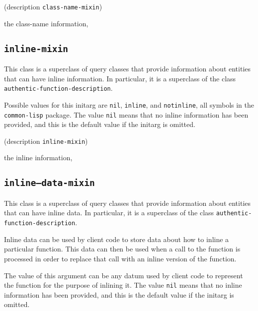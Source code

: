 {\footnotesize
{}
}

{\footnotesize
{} {(description {\tt class-name-mixin})}
}

 the class-name information, 

\subsection{\texttt{inline-mixin}}
\label{sec-inline-mixin}

{\footnotesize
{}
}

This class is a superclass of query classes that provide information
about entities that can have inline information.  In particular, it is a
superclass of the class \texttt{authentic-function-description}.

{\footnotesize
{}
}

Possible values for this initarg are \texttt{nil}, \texttt{inline},
and \texttt{notinline}, all symbols in the \texttt{common-lisp}
package.  The value \texttt{nil} means that no inline information has
been provided, and this is the default value if the initarg is omitted.

{\footnotesize
{} {(description {\tt inline-mixin})}
}

 the inline information, 

\subsection{\texttt{inline--data-mixin}}
\label{sec-inline-data-mixin}

{\footnotesize
{}
}

This class is a superclass of query classes that provide information
about entities that can have inline data.  In particular, it is a
superclass of the class \texttt{authentic-function-description}.

Inline data can be used by client code to store data about how to
inline a particular function.  This data can then be used when a call
to the function is processed in order to replace that call with an
inline version of the function.

{\footnotesize
{}
}

The value of this argument can be any datum used by client code to
represent the function for the purpose of inlining it.  The value
\texttt{nil} means that no inline information has been provided, and
this is the default value if the initarg is omitted.

